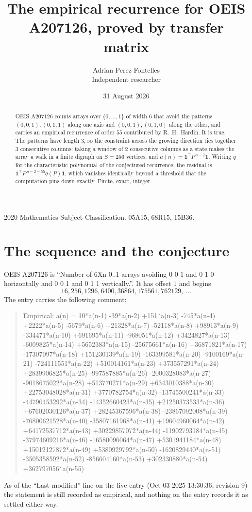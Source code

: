 \documentclass[11pt,a4paper]{article}
\title{The empirical recurrence for OEIS A207126, proved by transfer matrix}
\author{Adrian Perez Fontelles\\ \small Independent researcher}
\date{31 August 2026}
\theoremstyle{plain}
\theoremstyle{definition}
\begin{document}
\maketitle

\begin{abstract}
OEIS A207126 counts arrays over $\{0,\dots,1\}$ of width $6$ that avoid the patterns
$(0,0,1), (0,1,1)$ along one axis and $(0,0,1), (0,1,0)$ along the other, and carries an empirical recurrence of
order $55$ contributed by R.~H.~Hardin. It is true. The patterns have length $3$, so
the constraint across the growing direction ties together $3$ consecutive columns: taking a
window of $2$ consecutive columns as a state makes the array a walk in a finite digraph
on $S=256$ vertices, and $a(n)=\mathbf{1}^{\!\top}P^{\,n-2}\mathbf{1}$. Writing $q$
for the characteristic polynomial of the conjectured recurrence, the residual is
$\mathbf{1}^{\!\top}P^{\,n-2-55}q(P)\mathbf{1}$, which vanishes identically
beyond a threshold that the computation pins down exactly. Finite, exact, integer.
\end{abstract}

\noindent\small 2020 Mathematics Subject Classification. 05A15, 68R15, 15B36.\normalsize

\section{The sequence and the conjecture}

OEIS A207126 is ``Number of 6Xn 0..1 arrays avoiding 0 0 1 and 0 1 0 horizontally and 0 0 1 and 0 1 1 vertically.''. It has offset
$1$ and begins
\[
16, 256, 1296, 6400, 36864, 175561, 762129,\ \dots
\]
The entry carries the following comment:
\begin{quote}\small
Empirical: a(n) = 10*a(n-1) -39*a(n-2) +151*a(n-3) -745*a(n-4) +2222*a(n-5) -5679*a(n-6) +21328*a(n-7) -52118*a(n-8) +98913*a(n-9) -334471*a(n-10) +691695*a(n-11) -968051*a(n-12) +3424827*a(n-13) -6009825*a(n-14) +5652383*a(n-15) -25675661*a(n-16) +36871821*a(n-17) -17307097*a(n-18) +151230139*a(n-19) -163399581*a(n-20) -9100169*a(n-21) -724111551*a(n-22) +510014161*a(n-23) +373557291*a(n-24) +2839906825*a(n-25) -997587885*a(n-26) -2000328083*a(n-27) -9018675022*a(n-28) +513770271*a(n-29) +6343010388*a(n-30) +22753048028*a(n-31) +3770782754*a(n-32) -13745500241*a(n-33) -44790453292*a(n-34) -14352660423*a(n-35) +21250373533*a(n-36) +67602030126*a(n-37) +28245367596*a(n-38) -23867092008*a(n-39) -76800621528*a(n-40) -35807161968*a(n-41) +19604960064*a(n-42) +64172537712*a(n-43) +30229857072*a(n-44) -11902793184*a(n-45) -37974609216*a(n-46) -16580096064*a(n-47) +5301941184*a(n-48) +15012127872*a(n-49) +5380929792*a(n-50) -1620829440*a(n-51) -3505358592*a(n-52) -856604160*a(n-53) +302330880*a(n-54) +362797056*a(n-55)
\end{quote}
As of the ``Last modified'' line on the live entry (Oct 03 2025 13:30:36, revision
9) the statement is still recorded as empirical, and nothing on the entry
records it as settled either way.
\end{document}
